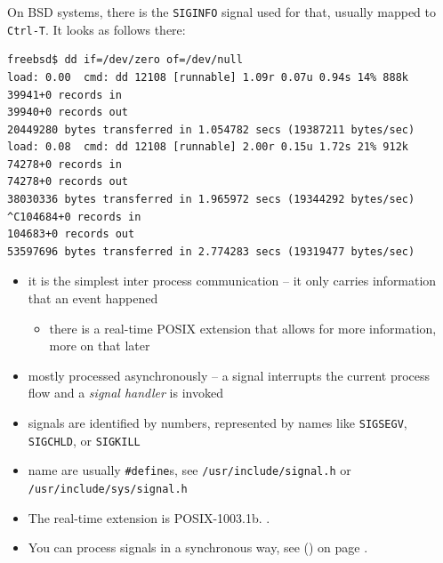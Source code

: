 On BSD systems, there is the \texttt{SIGINFO} signal used for that, usually
mapped to \texttt{Ctrl-T}.  It looks as follows there:

\begin{verbatim}
freebsd$ dd if=/dev/zero of=/dev/null
load: 0.00  cmd: dd 12108 [runnable] 1.09r 0.07u 0.94s 14% 888k
39941+0 records in
39940+0 records out
20449280 bytes transferred in 1.054782 secs (19387211 bytes/sec)
load: 0.08  cmd: dd 12108 [runnable] 2.00r 0.15u 1.72s 21% 912k
74278+0 records in
74278+0 records out
38030336 bytes transferred in 1.965972 secs (19344292 bytes/sec)
^C104684+0 records in
104683+0 records out
53597696 bytes transferred in 2.774283 secs (19319477 bytes/sec)
\end{verbatim}


\begin{slide}
\begin{itemize}
\item it is the simplest inter process communication -- it only carries
information that an event happened
\begin{itemize}
\item there is a real-time POSIX extension that allows for more information,
more on that later
\end{itemize}
\item mostly processed asynchronously -- a signal interrupts the current process
flow and a \emph{signal handler} is invoked
\item signals are identified by numbers, represented by names like
\texttt{SIGSEGV}, \texttt{SIGCHLD}, or \texttt{SIGKILL}
\item name are usually \texttt{\#define}s, see \texttt{/usr/include/signal.h} or
\texttt{/usr/include/sys/signal.h}
\end{itemize}
\end{slide}

\begin{itemize}
\item The real-time extension is POSIX-1003.1b.
\pageref{REALTIMEEXTENSIONS}.
\item You can process signals in a synchronous way, see () on
page \pageref{SIGWAIT}.
\end{itemize}



